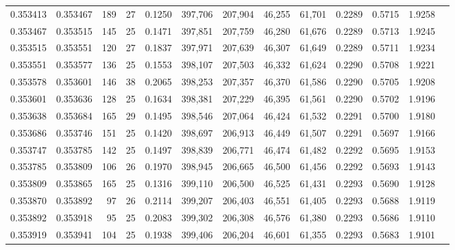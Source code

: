 \begin{tabular}{rrrrrrrrrrrrr}
0.353413 & 0.353467 &   189 &  27 &                                     0.1250 & 397,706 & 207,904 &  46,255 &  61,701 & 0.2289 & 0.5715 & 1.9258 \\
0.353467 & 0.353515 &   145 &  25 &                                     0.1471 & 397,851 & 207,759 &  46,280 &  61,676 & 0.2289 & 0.5713 & 1.9245 \\
0.353515 & 0.353551 &   120 &  27 &                                     0.1837 & 397,971 & 207,639 &  46,307 &  61,649 & 0.2289 & 0.5711 & 1.9234 \\
0.353551 & 0.353577 &   136 &  25 &                                     0.1553 & 398,107 & 207,503 &  46,332 &  61,624 & 0.2290 & 0.5708 & 1.9221 \\
0.353578 & 0.353601 &   146 &  38 &                                     0.2065 & 398,253 & 207,357 &  46,370 &  61,586 & 0.2290 & 0.5705 & 1.9208 \\
0.353601 & 0.353636 &   128 &  25 &                                     0.1634 & 398,381 & 207,229 &  46,395 &  61,561 & 0.2290 & 0.5702 & 1.9196 \\
0.353638 & 0.353684 &   165 &  29 &                                     0.1495 & 398,546 & 207,064 &  46,424 &  61,532 & 0.2291 & 0.5700 & 1.9180 \\
0.353686 & 0.353746 &   151 &  25 &                                     0.1420 & 398,697 & 206,913 &  46,449 &  61,507 & 0.2291 & 0.5697 & 1.9166 \\
0.353747 & 0.353785 &   142 &  25 &                                     0.1497 & 398,839 & 206,771 &  46,474 &  61,482 & 0.2292 & 0.5695 & 1.9153 \\
0.353785 & 0.353809 &   106 &  26 &                                     0.1970 & 398,945 & 206,665 &  46,500 &  61,456 & 0.2292 & 0.5693 & 1.9143 \\
0.353809 & 0.353865 &   165 &  25 &                                     0.1316 & 399,110 & 206,500 &  46,525 &  61,431 & 0.2293 & 0.5690 & 1.9128 \\
0.353870 & 0.353892 &    97 &  26 &                                     0.2114 & 399,207 & 206,403 &  46,551 &  61,405 & 0.2293 & 0.5688 & 1.9119 \\
0.353892 & 0.353918 &    95 &  25 &                                     0.2083 & 399,302 & 206,308 &  46,576 &  61,380 & 0.2293 & 0.5686 & 1.9110 \\
0.353919 & 0.353941 &   104 &  25 &                                     0.1938 & 399,406 & 206,204 &  46,601 &  61,355 & 0.2293 & 0.5683 & 1.9101 \\

\end{tabular}
